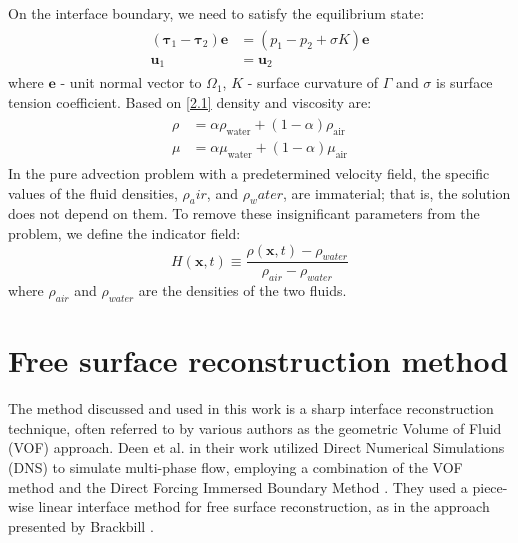 On the interface boundary, we need to satisfy the equilibrium state:
\begin{equation}
\begin{array}{c}
\begin{aligned}
\left(\boldsymbol{\tau}_{1}-\boldsymbol{\tau}_{2}\right) \mathbf{e}&=\left(p_{1}-p_{2}+\sigma K\right) \mathbf{e} \\
\mathbf{u}_{1} &=\mathbf{u}_{2}
\end{aligned}
\end{array}
\end{equation}
where $\mathbf{e}$ - unit normal vector to $\Omega_1$, $K$ - surface curvature of $\Gamma$ and $\sigma$ is surface tension coefficient. Based on \ref{2.1} density and viscosity are:
\begin{equation}
\begin{array}{c}
\begin{aligned}
        \rho &= \alpha \rho_{\text {water}}+(1-\alpha) \rho_{\text {air}} \\
        \mu &= \alpha \mu_{\text {water}}+(1-\alpha) \mu_{\text {air}}
\end{aligned}
\end{array}
\end{equation}
In the pure advection problem with a predetermined velocity field, the specific values of the fluid densities, $\rho_air$, and $\rho_water$, are immaterial; that is, the solution does not depend on them. To remove these insignificant parameters from the problem, we define the indicator field:
\begin{equation}\label{fraction}
H(\mathbf{x}, t) \equiv \frac{\rho(\mathbf{x}, t)-\rho_{water}}{\rho_{air}-\rho_{water}}
\end{equation}
where $\rho_{air}$ and $\rho_{water}$ are the densities of the two fluids.

\section{Free surface reconstruction method}

The method discussed and used in this work is a sharp interface reconstruction technique, often referred to by various authors as the geometric Volume of Fluid (VOF) approach. Deen et al. \cite{deen2009direct} in their work utilized Direct Numerical Simulations (DNS) to simulate multi-phase flow, employing a combination of the VOF method \cite{hirt1981vof} and the Direct Forcing Immersed Boundary Method \cite{uhlmann2005immersed}. They used a piece-wise linear interface method for free surface reconstruction, as in the approach presented by Brackbill \cite{brackbill1992continuum}.

